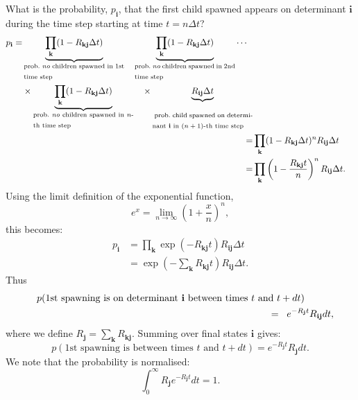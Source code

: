 \documentclass[a4paper, 11pt]{article}
\newcommand{\bi}{\mathbf{i}}
\newcommand{\bj}{\mathbf{j}}
\newcommand{\bk}{\mathbf{k}}
\begin{document}
What is the probability, $p_\bi$, that the first child spawned appears
on determinant $\bi$ during the time step starting at time $t=n\Delta t$?
\begin{align}
\begin{split}
p_\bi =& 
\underbrace{\prod_{\bk} (1-R_{\bk\bj}\Delta t)}_{\textrm{\parbox{4cm}{prob.\ \emph{no} children spawned in 1st time step}}}
\quad\underbrace{\prod_{\bk} (1-R_{\bk\bj}\Delta t)}_{\textrm{\parbox{4cm}{prob.\ \emph{no} children spawned in 2nd time step}}}
\cdots \\
& \times \underbrace{\prod_{\bk} (1-R_{\bk\bj}\Delta t)}_{\textrm{\parbox{4cm}{prob.\ \emph{no} children spawned in $n$-th time step}}} 
\quad\times \underbrace{R_{\bi\bj}\Delta
  t}_{\textrm{\parbox{4cm}{\rule{0mm}{5.5mm} prob.\ child spawned on determinant $\bi$ in $(n+1)$-th time step}}}
\end{split} \\
\hphantom{p}=& \prod_{\bk} (1-R_{\bk\bj}\Delta t)^n R_{\bi\bj}\Delta t \\
\hphantom{p}=& \prod_{\bk} 
\left(1-\frac{R_{\bk\bj}t}{n}\right)^n R_{\bi\bj}\Delta t .
\end{align}
Using the limit definition of the exponential function, 
\begin{equation}
e^x = \lim_{n\to\infty} \left(1+\frac{x}{n}\right)^n,
\end{equation}
this becomes:
\begin{align}
p_\bi &= \prod_{\bk} \exp\left(-R_{\bk\bj}t\right) R_{\bi\bj}\Delta t \\
  &= \exp\left(-\sum_\bk R_{\bk\bj}t\right)  R_{\bi\bj}\Delta t.
\end{align}
Thus
\begin{eqnarray}
& & p(\textrm{1st spawning is on determinant $\bi$ between times $t$ and
 $t+dt$}) \hspace*{3em} \\\nonumber
&& \quad = \;\; e^{-R_{\bj}t} R_{\bi\bj} dt,
\end{eqnarray}
where we define $R_\bj=\sum_\bk R_{\bk\bj}$. Summing over final states
$\bi$ gives:
\begin{equation}
p(\textrm{1st spawning is between times $t$ and $t+dt$}) = e^{-R_\bj t} R_\bj dt.
\end{equation}
We note that the probability is normalised:
\begin{equation}
\int_0^\infty R_\bj e^{-R_\bj t} dt = 1.
\end{equation}
\end{document}
